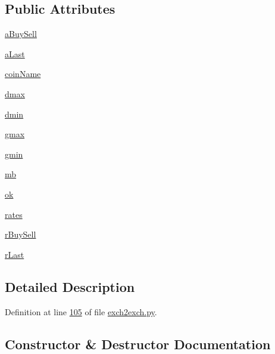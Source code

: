 \subsection*{Public Attributes}
\begin{DoxyCompactItemize}
\item 
\hyperlink{classexch2exch_1_1_differences_aac9b76364eb6e0ee83417c0128aaa001}{a\+Buy\+Sell}
\item 
\hyperlink{classexch2exch_1_1_differences_abd4dd96bd69025147d0bdb33d9c69345}{a\+Last}
\item 
\hyperlink{classexch2exch_1_1_differences_a0fb17548553b86b0ae62c2ef1a30981b}{coin\+Name}
\item 
\hyperlink{classexch2exch_1_1_differences_a261a74cc25d77b2608898fa5611f9f0b}{dmax}
\item 
\hyperlink{classexch2exch_1_1_differences_a7825bfca16b5775aa770c8810412b215}{dmin}
\item 
\hyperlink{classexch2exch_1_1_differences_a569f2a6fa0e33ad725c3c3ada259ddcc}{gmax}
\item 
\hyperlink{classexch2exch_1_1_differences_a33c9add531b5b46c49ae322657343382}{gmin}
\item 
\hyperlink{classexch2exch_1_1_differences_a81c81e9c15b5ea8a5d39bb99d85250e1}{mb}
\item 
\hyperlink{classexch2exch_1_1_differences_a6de3ee563584c83a97ba815db8ec7831}{ok}
\item 
\hyperlink{classexch2exch_1_1_differences_a64aec2fc7f20028f0bd834908cbea116}{rates}
\item 
\hyperlink{classexch2exch_1_1_differences_a3cbdf344e8e0b804c611e6b9e3a3d1bd}{r\+Buy\+Sell}
\item 
\hyperlink{classexch2exch_1_1_differences_a3c26c51929ce75e055f8a606aaeb849d}{r\+Last}
\end{DoxyCompactItemize}


\subsection{Detailed Description}


Definition at line \hyperlink{exch2exch_8py_source_l00105}{105} of file \hyperlink{exch2exch_8py_source}{exch2exch.\+py}.



\subsection{Constructor \& Destructor Documentation}
\mbox{\label{classexch2exch_1_1_differences_a8fd6c2cfe882605393c297053b73326e}} 
